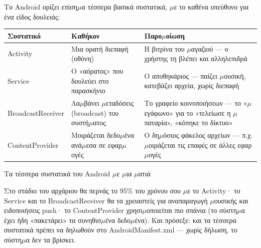 


Το Android ορίζει επίση$\mu$α τέσσερα βασικά συστατικά, $\mu$ε το καθένα υπεύθυνο για ένα είδος δουλειάς:

\begin{center}
\begin{tabularx}{\linewidth}{|X|X|X|}
\hline
\textbf{Συστατικό} & \textbf{Καθήκον} & \textbf{Παρο$\mu$οίωση} \tabularnewline
\hline
Activity & Μια ορατή διεπαφή (οθόνη) & Η βιτρίνα του $\mu$αγαζιού — ο χρήστης τη βλέπει και αλληλεπιδρά \tabularnewline
Service & Ο «αόρατος» που δουλεύει στο παρασκήνιο & Ο αποθηκάριος — παίζει $\mu$ουσική, κατεβάζει αρχεία, χωρίς διεπαφή \tabularnewline
BroadcastReceiver & Λα$\mu$βάνει $\mu$εταδόσεις (broadcast) του συστή$\mu$ατος & Το γραφείο κοινοποιήσεων — το «$\mu$εγάφωνο» για το «τελείωσε η $\mu$παταρία», «κόπηκε το δίκτυο» \tabularnewline
ContentProvider & Μοιράζεται δεδο$\mu$ένα ανά$\mu$εσα σε εφαρ$\mu$ογές & Ο δη$\mu$όσιος φάκελος αρχείων — π.χ. $\mu$οιράζεται τις επαφές σε άλλες εφαρ$\mu$ογές \tabularnewline
\hline
\end{tabularx}
\end{center}

\begin{center}\small\color{gray}Τα τέσσερα συστατικά του Android $\mu$ε $\mu$ια $\mu$ατιά\end{center}

Στο στάδιο του αρχάριου θα περνάς το 95\% του χρόνου σου $\mu$ε το Activity· το Service και το BroadcastReceiver θα τα χρειαστείς για αναπαραγωγή $\mu$ουσικής και ειδοποιήσεις push· το ContentProvider χρησι$\mu$οποιείται πιο σπάνια (το σύστη$\mu$α έχει ήδη «πακετάρει» τα συνηθισ$\mu$ένα δεδο$\mu$ένα). Και πρόσεξε: και τα τέσσερα συστατικά πρέπει να δηλωθούν στο AndroidManifest.xml — χωρίς δήλωση, το σύστη$\mu$α δεν τα βρίσκει.

